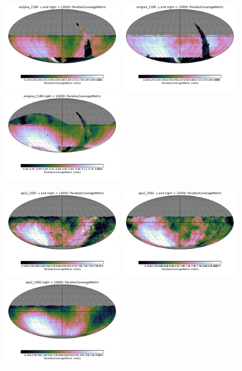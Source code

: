 \begin{figure}[ht]
  \begin{center}
  \includegraphics[width=2.0in]{./figs/milkyway/MW_Astrom_paCovge_1189_u_map.pdf}
  \includegraphics[width=2.0in]{./figs/milkyway/MW_Astrom_paCovge_1189_y_map.pdf}
  \includegraphics[width=2.0in]{./figs/milkyway/MW_Astrom_paCovge_1189_10y_map.pdf}
  \end{center}
  \begin{center}
  \includegraphics[width=2.0in]{./figs/milkyway/MW_Astrom_paCovge_1092_u_map.pdf}
  \includegraphics[width=2.0in]{./figs/milkyway/MW_Astrom_paCovge_1092_y_map.pdf}
  \includegraphics[width=2.0in]{./figs/milkyway/MW_Astrom_paCovge_1092_10y_map.pdf}
  \end{center}


\end{figure}
